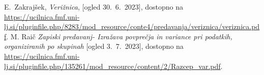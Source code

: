 \documentclass{article}
\begin{document}

\begin{thebibliography}{9}
        E.~Zakrajšek, \emph{Verižnica}, [ogled 30.~6.~2023], dostopno na \url{https://ucilnica.fmf.uni-lj.si/pluginfile.php/8283/mod_resource/conte4/predavanja/veriznica/veriznica.pdf}.
        M. Raič \emph{Zapiski predavanj- Izražava povprečja in variance pri podatkih, organiziranih po skupinah} [ogled 3.~7.~2023], dostopno na \url{https://ucilnica.fmf.uni-lj.si/pluginfile.php/135261/mod_resource/content/2/Razcep_var.pdf}.
\end{thebibliography}
\end{document}
